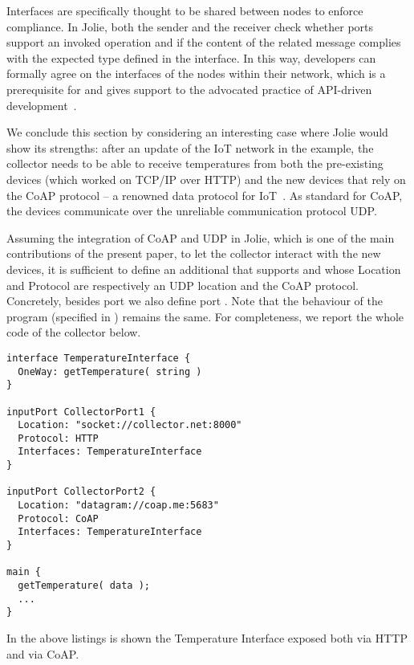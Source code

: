 Interfaces are specifically thought to be shared between nodes to enforce
compliance. In Jolie, both the sender and the receiver check whether ports
support an invoked operation and if the content of the related message complies
with the expected type defined in the interface. In this way, developers can
formally agree on the interfaces of the nodes within their network, which is a
prerequisite for and gives support to the advocated practice of API-driven
development~\cite{Schon2017}.

We conclude this section by considering an interesting case where Jolie would
show its strengths: after an update of the IoT network in the example, the
collector needs to be able to receive temperatures from both the pre-existing
devices (which worked on TCP/IP over HTTP) and the new devices that rely on the
CoAP protocol -- a renowned data protocol for IoT~\cite{coap}. As standard for
CoAP, the devices communicate over the unreliable communication protocol UDP.

Assuming the integration of CoAP and UDP in Jolie, which is one of the
main contributions of the present paper, to let the collector interact
with the new devices, it is sufficient to define an
additional  that supports
 and whose Location and Protocol are
respectively an UDP location and the CoAP protocol. Concretely, besides port
 we also define port .  Note that the
behaviour of the program (specified in ) remains the
same. For completeness, we report the whole code of the collector
below.
%

\begin{lstlisting}[xleftmargin=1em,label=temperature_interface]
interface TemperatureInterface {
  OneWay: getTemperature( string )
}

inputPort CollectorPort1 {
  Location: "socket://collector.net:8000"
  Protocol: HTTP
  Interfaces: TemperatureInterface
}

inputPort CollectorPort2 {
  Location: "datagram://coap.me:5683"
  Protocol: CoAP
  Interfaces: TemperatureInterface
}

main {
  getTemperature( data );
  ...
}
\end{lstlisting}
In the above listings is shown the Temperature Interface exposed both via HTTP and via CoAP.
